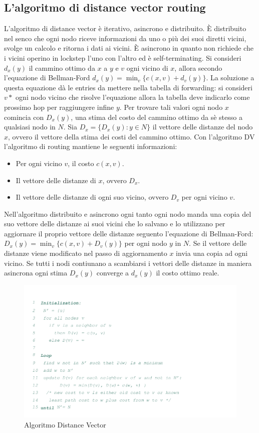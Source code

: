 \subsection{L'algoritmo di distance vector routing}
L'algoritmo di distance vector \`e iterativo, asincrono e distribuito. \`E distribuito nel senco che ogni nodo riceve informazioni da uno o pi\`u dei suoi
diretti vicini, svolge un calcolo e ritorna i dati ai vicini. \`E asincrono in quanto non richiede che i vicini operino in lockstep l'uno con l'altro ed \`e
self-terminating. Si consideri $d_x(y)$ il cammino ottimo da $x$ a $y$ e $v$ ogni vicino di $x$, allora secondo l'equazione di Bellman-Ford $d_x(y)=\min_v
\{c(x, v)+d_v(y)\}$. La soluzione a questa equazione d\`a le entries da mettere nella tabella di forwarding: si consideri $v*$ ogni nodo vicino che risolve
l'equazione allora la tabella deve indicarlo come prossimo hop per raggiungere infine $y$. Per trovare tali valori ogni nodo $x$ comincia con $D_x(y)$, una
stima del costo del cammino ottimo da s\`e stesso a qualsiasi nodo in $N$. Sia $D_x=\{D_x(y):y\in N\}$ il vettore delle distanze del nodo $x$, ovvero il
vettore della stima dei costi del cammino ottimo. Con l'algoritmo DV l'algoritmo di routing mantiene le seguenti informazioni:
\begin{itemize}
\item Per ogni vicino $v$, il costo $c(x, v)$.
\item Il vettore delle distanze di $x$, ovvero $D_x$.
\item Il vettore delle distanze di ogni suo vicino, ovvero $D_v$ per ogni vicino $v$.
\end{itemize}
Nell'algoritmo distribuito e asincrono ogni tanto ogni nodo manda una copia del suo vettore delle distanze ai suoi vicini che lo salvano e lo utilizzano
per aggiornare il proprio vettore delle distanze seguento l'equazione di Bellman-Ford: $D_x(y)=\min_v\{c(x, v)+D_v(y)\}$ per ogni nodo $y$ in $N$. Se il 
vettore delle distanze viene modificato nel passo di aggiornamento $x$ invia una copia ad ogni vicino. Se tutti i nodi contiunano a scambiarsi i vettori 
delle distanze in maniera asincrona ogni stima $D_x(y)$ converge a $d_x(y)$ il costo ottimo reale. 
\begin{figure}[h]
\includegraphics[width=\textwidth]{AlgoritmoDijkstra.png}
\caption{Algoritmo Distance Vector}
\end{figure}
